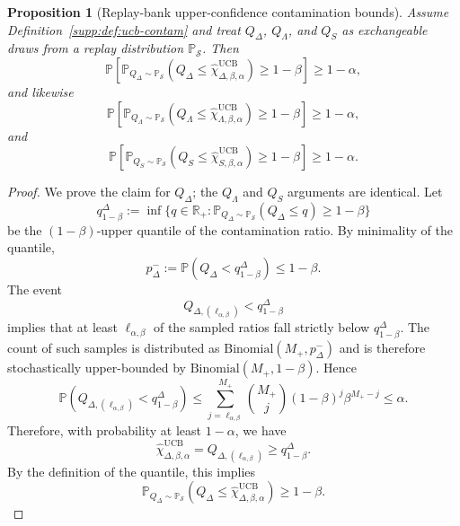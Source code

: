 \documentclass[11pt]{article}
\newcommand{\Prob}{\mathbb{P}}
\newcommand{\1}{\mathbf{1}}
\theoremstyle{definition}
\theoremstyle{plain}
\newtheorem{proposition}[definition]{Proposition}
\theoremstyle{remark}
\begin{document}
\begin{proposition}[Replay-bank upper-confidence contamination bounds]
\label{supp:prop:ucb-contam}
Assume Definition~\ref{supp:def:ucb-contam} and treat $Q_\Delta$, $Q_\Lambda$, and $Q_S$ as exchangeable draws from a replay distribution $\Prob_{\mathcal S}$. Then
\[
\Prob\!\left[
\Prob_{Q_\Delta\sim \Prob_{\mathcal S}}\!\left(Q_\Delta \le \widehat\chi_{\Delta,\beta,\alpha}^{\mathrm{UCB}}\right) \ge 1-\beta
\right]
\ge 1-\alpha,
\]
and likewise
\[
\Prob\!\left[
\Prob_{Q_\Lambda\sim \Prob_{\mathcal S}}\!\left(Q_\Lambda \le \widehat\chi_{\Lambda,\beta,\alpha}^{\mathrm{UCB}}\right) \ge 1-\beta
\right]
\ge 1-\alpha,
\]
and
\[
\Prob\!\left[
\Prob_{Q_S\sim \Prob_{\mathcal S}}\!\left(Q_S \le \widehat\chi_{S,\beta,\alpha}^{\mathrm{UCB}}\right) \ge 1-\beta
\right]
\ge 1-\alpha.
\]
\end{proposition}

\begin{proof}
We prove the claim for $Q_\Delta$; the $Q_\Lambda$ and $Q_S$ arguments are identical. Let
\[
q_{1-\beta}^{\Delta}
:=
\inf\{q\in\mathbb R_+ : \Prob_{Q_\Delta\sim \Prob_{\mathcal S}}(Q_\Delta \le q)\ge 1-\beta\}
\]
be the $(1-\beta)$-upper quantile of the contamination ratio. By minimality of the quantile,
\[
p^-_\Delta := \Prob(Q_\Delta < q_{1-\beta}^{\Delta}) \le 1-\beta.
\]
The event
\[
Q_{\Delta,(\ell_{\alpha,\beta})} < q_{1-\beta}^{\Delta}
\]
implies that at least $\ell_{\alpha,\beta}$ of the sampled ratios fall strictly below $q_{1-\beta}^{\Delta}$. The count of such samples is distributed as $\mathrm{Binomial}(M_+,p^-_\Delta)$ and is therefore stochastically upper-bounded by $\mathrm{Binomial}(M_+,1-\beta)$. Hence
\[
\Prob\!\left(Q_{\Delta,(\ell_{\alpha,\beta})} < q_{1-\beta}^{\Delta}\right)
\le
\sum_{j=\ell_{\alpha,\beta}}^{M_+}\binom{M_+}{j}(1-\beta)^j\beta^{M_+-j}
\le \alpha.
\]
Therefore, with probability at least $1-\alpha$, we have
\[
\widehat\chi_{\Delta,\beta,\alpha}^{\mathrm{UCB}} = Q_{\Delta,(\ell_{\alpha,\beta})} \ge q_{1-\beta}^{\Delta}.
\]
By the definition of the quantile, this implies
\[
\Prob_{Q_\Delta\sim \Prob_{\mathcal S}}\!\left(Q_\Delta \le \widehat\chi_{\Delta,\beta,\alpha}^{\mathrm{UCB}}\right) \ge 1-\beta.
\]
\end{proof}
\end{document}
